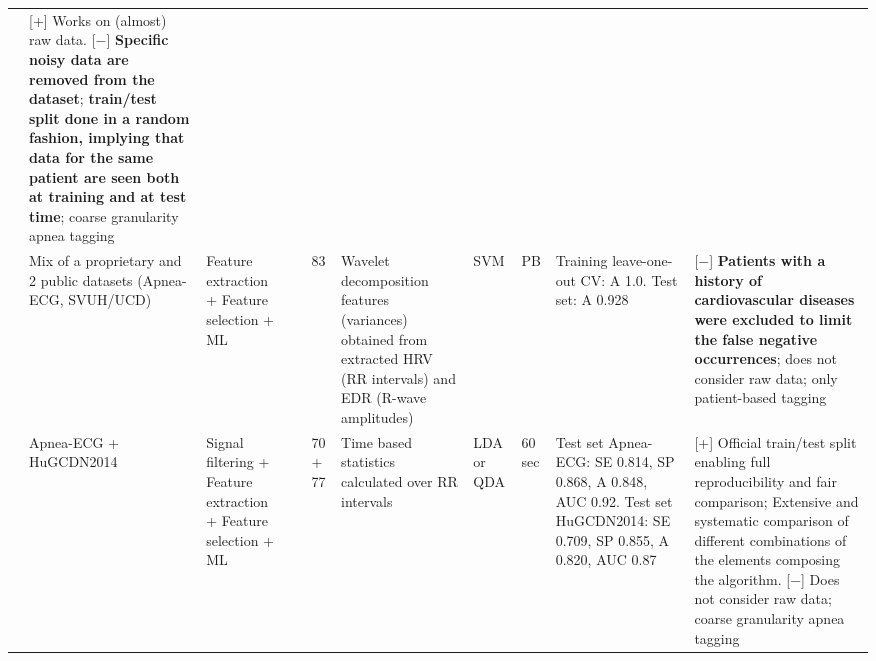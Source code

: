 \documentclass[5p,twocolumn,lefttitle]{elsarticle}
\begin{document}
\begin{table*}[!ht]
{\begin{tabularx}{2\textwidth}{@{}m{2.5em}p{7em}p{10em}lp{2em}p{12em}p{7em}p{3em}p{17em}X@{}}
                            & [+] Works on (almost) raw data. [$-$] \textbf{Specific noisy data are removed from the dataset}; \textbf{train/test split done in a random fashion, implying that data for the same patient are seen both at training and at test time}; coarse granularity apnea tagging                                                                                                                                                                                                                                                         \\
            \cmidrule(l){2-10} 
                            & Mix of a proprietary and 2 public datasets (Apnea-ECG, SVUH/UCD) & Feature extraction + Feature selection + ML                    & \cite{DBLP:journals/titb/KhandokerPK09}  & 83            & Wavelet decomposition features (variances) obtained from extracted HRV (RR intervals) and EDR (R-wave amplitudes) & SVM                                 & PB                                & Training leave-one-out CV: A 1.0. Test set: A 0.928                                                                                                                                    & [$-$] \textbf{Patients with a history of cardiovascular diseases were excluded to limit the false negative occurrences}; does not consider raw data; only patient-based tagging                                                                                                                                                                                                                                                       \\
            \cmidrule(l){2-10} 
                            & Apnea-ECG + HuGCDN2014                                  & Signal filtering + Feature extraction + Feature selection + ML & \cite{martin2017heart}                   & 70 + 77       & Time based statistics calculated over RR intervals                                                                & LDA or QDA                          & 60 sec                                     & Test set Apnea-ECG: SE 0.814, SP 0.868, A 0.848, AUC 0.92. Test set HuGCDN2014: SE 0.709, SP 0.855, A 0.820, AUC 0.87                                                                  & [+] Official train/test split enabling full reproducibility and fair comparison; Extensive and systematic comparison of different combinations of the elements composing the algorithm. [$-$] Does not consider raw data; coarse granularity apnea tagging                                                                                                                                                                                               \\

\end{tabularx}}
\end{table*}
\end{document}
